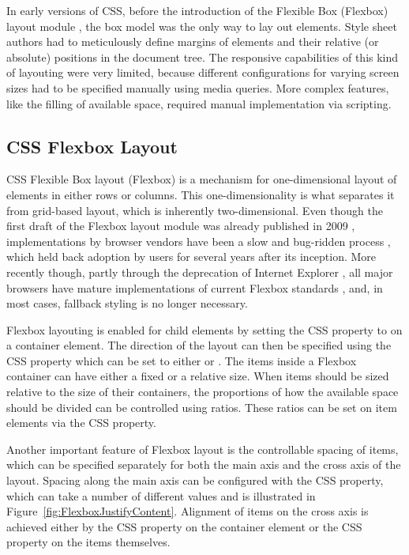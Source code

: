 In early versions of CSS, before the introduction of the Flexible Box
(Flexbox) layout module \parencite{CSSFlexboxFirstDraft}, the box
model was the only way to lay out elements. Style sheet authors had to
meticulously define margins of elements and their relative (or
absolute) positions in the document tree. The responsive capabilities
of this kind of layouting were very limited, because different
configurations for varying screen sizes had to be specified manually
using media queries. More complex features, like the filling of
available space, required manual implementation via scripting.





\subsection{CSS Flexbox Layout}
\label{sec:Flexbox}

CSS Flexible Box layout (Flexbox) \parencite{CSSFlexbox} is a
mechanism for one-dimensional layout of elements in either rows or
columns. This one-dimensionality is what separates it from grid-based
layout, which is inherently two-dimensional.
%
Even though the first draft of the Flexbox layout module was already
published in 2009 \parencite{CSSFlexboxFirstDraft}, implementations by
browser vendors have been a slow and bug-ridden process
\parencite{CanIUseCSSFlexbox}, which held back adoption by users for
several years after its inception. More recently though, partly
through the deprecation of Internet Explorer
\parencite{IEDeprecation}, all major browsers have mature
implementations of current Flexbox standards \parencite{CSSFlexbox},
and, in most cases, fallback styling is no longer necessary.

Flexbox layouting is enabled for child elements by setting the CSS
 property to  on a container element. The
direction of the layout can then be specified using the CSS
 property which can be set to either
 or .
%
The items inside a Flexbox container can have either a fixed or a
relative size. When items should be sized relative to the size of
their containers, the proportions of how the available space should be
divided can be controlled using ratios. These ratios can be set on
item elements via the CSS  property.

Another important feature of Flexbox layout is the controllable
spacing of items, which can be specified separately for both the main
axis and the cross axis of the layout. Spacing along the main axis can
be configured with the CSS  property, which
can take a number of different values and is illustrated in
Figure~\ref{fig:FlexboxJustifyContent}. Alignment of items on the
cross axis is achieved either by the CSS 
property on the container element or the CSS 
property on the items themselves.

